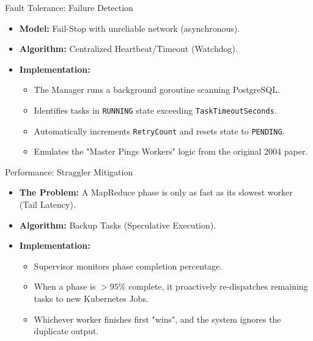 \documentclass[10pt,aspectratio=169]{beamer}
\begin{document}
\begin{frame}{Fault Tolerance: Failure Detection}
    \begin{itemize}
        \item \textbf{Model:} Fail-Stop with unreliable network (asynchronous).
        \item \textbf{Algorithm:} Centralized Heartbeat/Timeout (Watchdog).
        \item \textbf{Implementation:}
            \begin{itemize}
                \item The Manager runs a background goroutine scanning PostgreSQL.
                \item Identifies tasks in \texttt{RUNNING} state exceeding \texttt{TaskTimeoutSeconds}.
                \item Automatically increments \texttt{RetryCount} and resets state to \texttt{PENDING}.
                \item Emulates the "Master Pings Workers" logic from the original 2004 paper.
            \end{itemize}
    \end{itemize}
\end{frame}

\begin{frame}{Performance: Straggler Mitigation}
    \begin{itemize}
        \item \textbf{The Problem:} A MapReduce phase is only as fast as its slowest worker (Tail Latency).
        \item \textbf{Algorithm:} Backup Tasks (Speculative Execution).
        \item \textbf{Implementation:}
            \begin{itemize}
                \item Supervisor monitors phase completion percentage.
                \item When a phase is $>95\%$ complete, it proactively re-dispatches remaining tasks to new Kubernetes Jobs.
                \item Whichever worker finishes first "wins", and the system ignores the duplicate output.
            \end{itemize}
    \end{itemize}
\end{frame}
\end{document}
